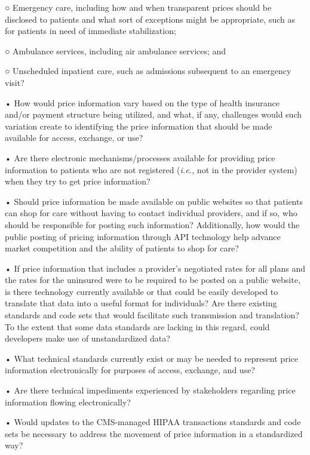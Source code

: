 \documentclass[twoside,11pt]{article}
\begin{document}
          ○ Emergency care, including how and when transparent prices should be disclosed to patients and what sort of exceptions might be appropriate, such as for patients in need of immediate stabilization;


          ○ Ambulance services, including air ambulance services; and


          ○ Unscheduled inpatient care, such as admissions subsequent to an emergency visit?


          • How would price information vary based on the type of health insurance and/or payment structure being utilized, and what, if any, challenges would such variation create to identifying the price information that should be made available for access, exchange, or use?



          • Are there electronic mechanisms/processes available for providing price information to patients who are not registered (\emph{i.e.,} not in the provider system) when they try to get price information?


          • Should price information be made available on public websites so that patients can shop for care without having to contact individual providers, and if so, who should be responsible for posting such information? Additionally, how would the public posting of pricing information through API technology help advance market competition and the ability of patients to shop for care?


          • If price information that includes a provider's negotiated rates for all plans and the rates for the uninsured were to be required to be posted on a public website, is there technology currently available or that could be easily developed to translate that data into a useful format for individuals? Are there existing standards and code sets that would facilitate such transmission and translation? To the extent that some data standards are lacking in this regard, could developers make use of unstandardized data?


          • What technical standards currently exist or may be needed to represent price information electronically for purposes of access, exchange, and use?


          • Are there technical impediments experienced by stakeholders regarding price information flowing electronically?


          • Would updates to the CMS-managed HIPAA transactions standards and code sets be necessary to address the movement of price information in a standardized way?
\end{document}

